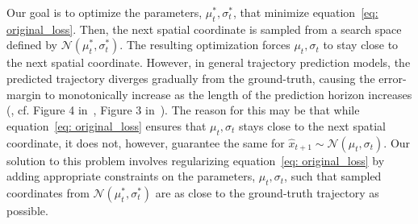 \documentclass[10pt,twocolumn,letterpaper]{article}
\theoremstyle{plain}
\begin{document}
\noindent Our goal is to optimize the parameters, $\mu^{*}_t, \sigma^{*}_t$, that minimize equation~\ref{eq: original_loss}. Then, the next spatial coordinate is sampled from a search space defined by $\mathcal{N}(\mu^{*}_t, \sigma^{*}_t)$. The resulting optimization forces $\mu_t, \sigma_t$ to stay close to the next spatial coordinate. However, in general trajectory prediction models, the predicted trajectory diverges gradually from the ground-truth, causing the error-margin to monotonically increase as the length of the prediction horizon increases (\cite{anima}, cf. Figure 4 in~\cite{nachiket,traphic}, Figure 3 in~\cite{li2019grip}). The reason for this may be that while equation~\ref{eq: original_loss} ensures that $\mu_t, \sigma_t$ stays close to the next spatial coordinate, it does not, however, guarantee the same for $\hat x_{t+1} \sim \mathcal{N}(\mu_t, \sigma_t)$. Our solution to this problem involves regularizing equation~\ref{eq: original_loss} by adding appropriate constraints on the parameters, $\mu_t, \sigma_t$, such that sampled coordinates from $\mathcal{N}(\mu^{*}_t, \sigma^{*}_t)$ are as close to the ground-truth trajectory as possible.
\begin{table*}[h!]
\centering
{}
\caption{\textbf{Main Results:} We report the Average Displacement Error (ADE) and Final Displacement Error (FDE) for prior road-agent trajectory prediction methods. Lower scores are better and \textbf{bold} indicates the SOTA. In addition to achieving the lowest ADE/FDE, we also reduce long term prediction error by at least 5 times (difference between values in the last two columns). All results are reported in meters. ($*$) indicates a particular method did not converge for the entire prediction length. }
\label{tab: accuracy}
\vspace{-5pt}
\end{table*} 
\end{document}
